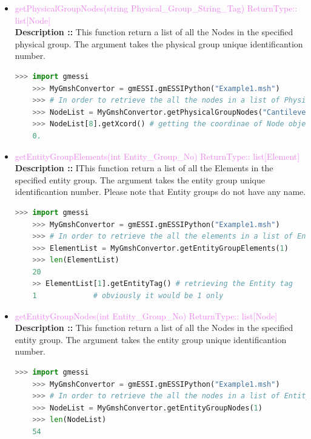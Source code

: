 \documentclass[11pt]{article}
\begin{document}
\begin{itemize}
    \item \textcolor{violet}{ getPhysicalGroupNodes(string Physical\_Group\_String\_Tag) \hfill {ReturnType:: list[Node]}} \\
    \textbf{Description ::} This function return a list of all the Nodes in the specified physical group. The argument takes the physical group unique identificantion number. 
    \begin{lstlisting}[language=Python]
    >>> import gmessi
    >>> MyGmshConvertor = gmESSI.gmESSIPython("Example1.msh")
    >>> # In order to retrieve the all the nodes in a list of Physical group of Id 3 "CantileverVolume"
    >>> NodeList = MyGmshConvertor.getPhysicalGroupNodes("CantileverVolume")
    >>> NodeList[8].getXcord() # getting the coordinae of Node object in the list at index 8.
    0.
    \end{lstlisting}

    \item \textcolor{violet}{ getEntityGroupElements(int Entity\_Group\_No) \hfill {ReturnType:: list[Element]}} \\
    \textbf{Description ::} IThis function return a list of all the Elements in the specified entity group. The argument takes the entity group unique identificantion number. Please note that Entity groups do not have any name.
    \begin{lstlisting}[language=Python]
    >>> import gmessi
    >>> MyGmshConvertor = gmESSI.gmESSIPython("Example1.msh")
    >>> # In order to retrieve the all the elements in a list of Entity group of Id 1 
    >>> ElementList = MyGmshConvertor.getEntityGroupElements(1)
    >>> len(ElementList)
    20
    >> ElementList[1].getEntityTag() # retrieving the Entity tag
    1             # obviously it would be 1 only
    \end{lstlisting}

    \item \textcolor{violet}{ getEntityGroupNodes(int Entity\_Group\_No) \hfill {ReturnType:: list[Node]}} \\
    \textbf{Description ::} This function return a list of all the Nodes in the specified entity group. The argument takes the entity group unique identificantion number.
    \begin{lstlisting}[language=Python]
    >>> import gmessi
    >>> MyGmshConvertor = gmESSI.gmESSIPython("Example1.msh")
    >>> # In order to retrieve the all the nodes in a list of Entity group of Id 1
    >>> NodeList = MyGmshConvertor.getEntityGroupNodes(1)
    >>> len(NodeList)
    54
    \end{lstlisting}


\end{itemize}
\end{document}
